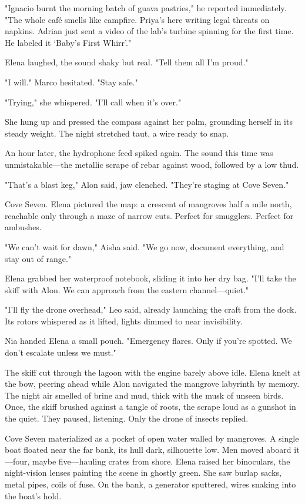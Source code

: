 "Ignacio burnt the morning batch of guava pastries," he reported immediately. "The whole café smells like campfire. Priya's here writing legal threats on napkins. Adrian just sent a video of the lab's turbine spinning for the first time. He labeled it `Baby's First Whirr'."

Elena laughed, the sound shaky but real. "Tell them all I'm proud."

"I will." Marco hesitated. "Stay safe."

"Trying," she whispered. "I'll call when it's over."

She hung up and pressed the compass against her palm, grounding herself in its steady weight. The night stretched taut, a wire ready to snap.

\bigskip

An hour later, the hydrophone feed spiked again. The sound this time was unmistakable—the metallic scrape of rebar against wood, followed by a low thud.

"That's a blast keg," Alon said, jaw clenched. "They're staging at Cove Seven."

Cove Seven. Elena pictured the map: a crescent of mangroves half a mile north, reachable only through a maze of narrow cuts. Perfect for smugglers. Perfect for ambushes.

"We can't wait for dawn," Aisha said. "We go now, document everything, and stay out of range."

Elena grabbed her waterproof notebook, sliding it into her dry bag. "I'll take the skiff with Alon. We can approach from the eastern channel—quiet."

"I'll fly the drone overhead," Leo said, already launching the craft from the dock. Its rotors whispered as it lifted, lights dimmed to near invisibility.

Nia handed Elena a small pouch. "Emergency flares. Only if you're spotted. We don't escalate unless we must."

The skiff cut through the lagoon with the engine barely above idle. Elena knelt at the bow, peering ahead while Alon navigated the mangrove labyrinth by memory. The night air smelled of brine and mud, thick with the musk of unseen birds. Once, the skiff brushed against a tangle of roots, the scrape loud as a gunshot in the quiet. They paused, listening. Only the drone of insects replied.

Cove Seven materialized as a pocket of open water walled by mangroves. A single boat floated near the far bank, its hull dark, silhouette low. Men moved aboard it—four, maybe five—hauling crates from shore. Elena raised her binoculars, the night-vision lenses painting the scene in ghostly green. She saw burlap sacks, metal pipes, coils of fuse. On the bank, a generator sputtered, wires snaking into the boat's hold.

